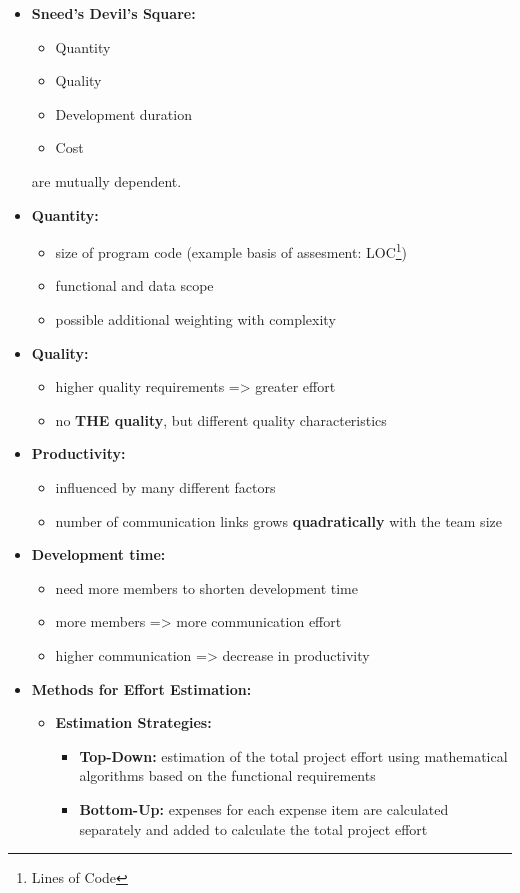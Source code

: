 \documentclass[ieeetran]{article}
\begin{document}
\begin{itemize}
  \item \textbf{Sneed's Devil's Square:}
	  \begin{itemize}
	    \item Quantity
	\item Quality 
	\item Development duration
	\item Cost		
	  \end{itemize}
are mutually dependent.

\item \textbf{Quantity:}
	\begin{itemize}
		\item size of program code (example basis of assesment: LOC\footnote{Lines of Code})
		  \item functional and data scope
			  \item possible additional weighting with complexity
	\end{itemize}

\item \textbf{Quality:}
	\begin{itemize}
	  \item higher quality requirements => greater effort
	\item no \textbf{THE quality}, but different quality characteristics
	\end{itemize}

\item \textbf{Productivity:}
	\begin{itemize}
	  \item influenced by many different factors
	\item number of communication links grows \textbf{quadratically} with the team size
	\end{itemize}

\item \textbf{Development time:}
	\begin{itemize}
	  \item need more members to shorten development time
	\item more members => more communication effort
	\item higher communication => decrease in productivity
	\end{itemize}

\item \textbf{Methods for Effort Estimation:}
\begin{itemize}
  \item \textbf{Estimation Strategies:}
	  \begin{itemize}
	    \item \textbf{Top-Down:} estimation of the total project effort using mathematical algorithms based on the functional requirements
	\item \textbf{Bottom-Up:} expenses for each expense item are calculated separately and added to calculate the total project effort
	  \end{itemize}


\end{itemize}
\end{itemize}
\end{document}
